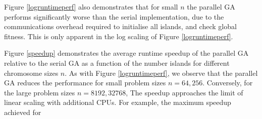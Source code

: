 \documentclass{report}
\begin{document}
Figure \ref{logruntimeperf} also demonstrates that for small \(n\) the parallel GA performs significantly worse than the serial implementation, due to the communications overhead required to initialise all islands, and check global fitness. This is only apparent in the log scaling of Figure \ref{logruntimeperf}. 

Figure \ref{speedup} demonstrates the average runtime speedup of the parallel GA relative to the serial GA as a function of the number islands for different chromosome sizes \(n\). As with Figure \ref{logruntimeperf}, we observe that the parallel GA reduces the performance for small problem sizes \(n=64,256\). Conversely, for the large problem sizes \(n=8192, 32768\), The speedup approaches the limit of linear scaling with additional CPUs. For example, the maximum speedup achieved for 
\end{document}
